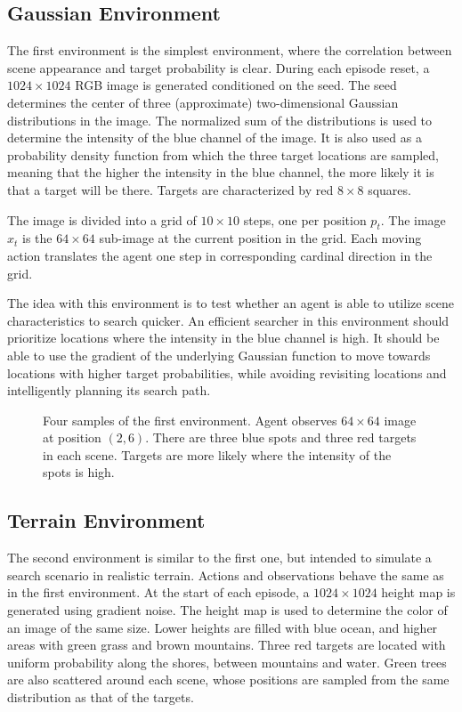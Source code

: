 \subsection{Gaussian Environment}

The first environment is the simplest environment, where the correlation between scene appearance and target probability is clear.
During each episode reset, a \(1024 \times 1024\) RGB image is generated conditioned on the seed.
The seed determines the center of three (approximate) two-dimensional Gaussian distributions in the image.
The normalized sum of the distributions is used to determine the intensity of the blue channel of the image.
It is also used as a probability density function from which the three target locations are sampled, meaning that the higher the intensity in the blue channel, the more likely it is that a target will be there.
Targets are characterized by red \(8 \times 8\) squares.

The image is divided into a grid of \(10 \times 10\) steps, one per position \(p_t\).
The image \(x_t\) is the \(64 \times 64\) sub-image at the current position in the grid.
Each moving action translates the agent one step in corresponding cardinal direction in the grid.

The idea with this environment is to test whether an agent is able to utilize scene characteristics to search quicker.
An efficient searcher in this environment should prioritize locations where the intensity in the blue channel is high.
It should be able to use the gradient of the underlying Gaussian function to move towards locations with higher target probabilities, while avoiding revisiting locations and intelligently planning its search path.

\begin{figure}
    \centering
    
    \caption[Gaussian environment]{Four samples of the first environment. Agent observes \(64 \times 64\) image at position \((2, 6)\). There are three blue spots and three red targets in each scene. Targets are more likely where the intensity of the spots is high.}
    \label{fig:gaussian}
\end{figure}

\subsection{Terrain Environment}

The second environment is similar to the first one, but intended to simulate a search scenario in realistic terrain.
Actions and observations behave the same as in the first environment.
At the start of each episode, a \(1024 \times 1024\) height map is generated using gradient noise.
The height map is used to determine the color of an image of the same size.
Lower heights are filled with blue ocean, and higher areas with green grass and brown mountains.
Three red targets are located with uniform probability along the shores, between mountains and water.
Green trees are also scattered around each scene, whose positions are sampled from the same distribution as that of the targets.

